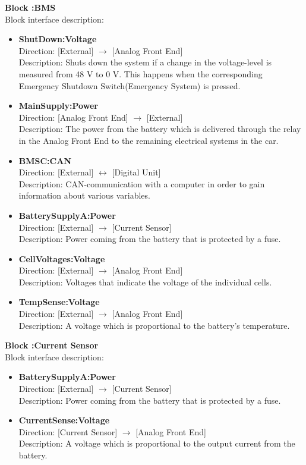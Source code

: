 \textbf{Block :BMS}\\
Block interface description:
\begin{itemize}
	\item \textbf{ShutDown:Voltage}\\
	Direction: [External] $\rightarrow$ [Analog Front End]\\
	Description: Shuts down the system if a change in the voltage-level is measured from 48 V to 0 V. This happens when the corresponding Emergency Shutdown Switch(Emergency System) is pressed.
	\item \textbf{MainSupply:Power}\\
	Direction: [Analog Front End] $\rightarrow$ [External]\\
	Description: The power from the battery which is delivered through the relay in the Analog Front End to the remaining electrical systems in the car. 
	\item \textbf{BMSC:CAN}\\
	Direction: [External] $\leftrightarrow$ [Digital Unit]\\
	Description: CAN-communication with a computer in order to gain information about various variables.
	\item \textbf{BatterySupplyA:Power}\\
	Direction: [External] $\rightarrow$ [Current Sensor]\\
	Description: Power coming from the battery that is protected by a fuse.
	\item \textbf{CellVoltages:Voltage}\\
	Direction: [External] $\rightarrow$ [Analog Front End]\\
	Description: Voltages that indicate the voltage of the individual cells.
	\item \textbf{TempSense:Voltage}\\
	Direction: [External] $\rightarrow$ [Analog Front End]\\
	Description: A voltage which is proportional to the battery's temperature.
\end{itemize}

\textbf{Block :Current Sensor}\\
Block interface description:
\begin{itemize}
	\item \textbf{BatterySupplyA:Power}\\
	Direction: [External] $\rightarrow$ [Current Sensor]\\
	Description: Power coming from the battery that is protected by a fuse.
	\item \textbf{CurrentSense:Voltage}\\
	Direction: [Current Sensor] $\rightarrow$ [Analog Front End]\\
	Description: A voltage which is proportional to the output current from the battery.
\end{itemize}

